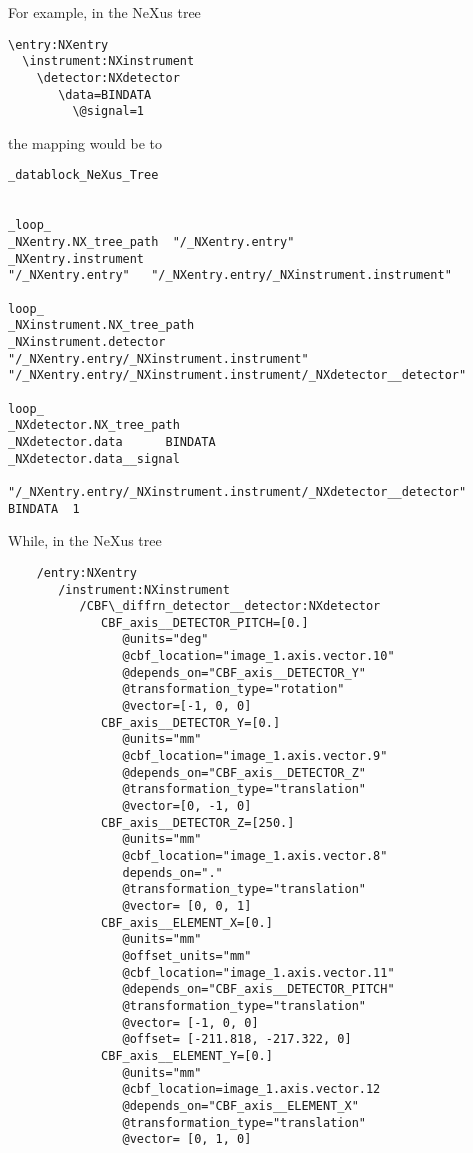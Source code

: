 \documentclass[11pt]{article}
\begin{document}
{{\begin{itemize}
\end{itemize}


For example, in the NeXus tree

\begin{verbatim}
\entry:NXentry
  \instrument:NXinstrument
    \detector:NXdetector
       \data=BINDATA
         \@signal=1
\end{verbatim}

the mapping would be to 

\begin{verbatim}
_datablock_NeXus_Tree


_loop_
_NXentry.NX_tree_path  "/_NXentry.entry"
_NXentry.instrument   
"/_NXentry.entry"   "/_NXentry.entry/_NXinstrument.instrument"

loop_
_NXinstrument.NX_tree_path 
_NXinstrument.detector   
"/_NXentry.entry/_NXinstrument.instrument" "/_NXentry.entry/_NXinstrument.instrument/_NXdetector__detector"

loop_
_NXdetector.NX_tree_path 
_NXdetector.data      BINDATA
_NXdetector.data__signal  

"/_NXentry.entry/_NXinstrument.instrument/_NXdetector__detector"  BINDATA  1

\end{verbatim}

While, in the NeXus tree

\begin{verbatim}
    /entry:NXentry
       /instrument:NXinstrument
          /CBF\_diffrn_detector__detector:NXdetector
             CBF_axis__DETECTOR_PITCH=[0.]
                @units="deg"
                @cbf_location="image_1.axis.vector.10"
                @depends_on="CBF_axis__DETECTOR_Y"
                @transformation_type="rotation"
                @vector=[-1, 0, 0]
             CBF_axis__DETECTOR_Y=[0.]
                @units="mm"
                @cbf_location="image_1.axis.vector.9"
                @depends_on="CBF_axis__DETECTOR_Z"
                @transformation_type="translation"
                @vector=[0, -1, 0]
             CBF_axis__DETECTOR_Z=[250.]
                @units="mm"
                @cbf_location="image_1.axis.vector.8"
                depends_on="."
                @transformation_type="translation"
                @vector= [0, 0, 1]
             CBF_axis__ELEMENT_X=[0.]
                @units="mm"
                @offset_units="mm"
                @cbf_location="image_1.axis.vector.11"
                @depends_on="CBF_axis__DETECTOR_PITCH"
                @transformation_type="translation"
                @vector= [-1, 0, 0]
                @offset= [-211.818, -217.322, 0]
             CBF_axis__ELEMENT_Y=[0.]
                @units="mm"
                @cbf_location=image_1.axis.vector.12
                @depends_on="CBF_axis__ELEMENT_X"
                @transformation_type="translation"
                @vector= [0, 1, 0]
\end{verbatim}

}}
\end{document}

